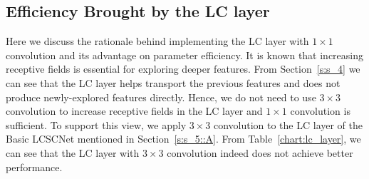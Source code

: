 \documentclass[journal]{IEEEtran}
\begin{document}
\subsection{Efficiency Brought by the LC layer} \label{s:s_5::B}

\begin{table}[htbp]
\centering
{}
\end{table}


Here we discuss the rationale behind implementing the LC layer with $1 \times 1$ convolution and its advantage on parameter efficiency. It is known that increasing receptive fields is essential for exploring deeper features. From Section~\ref{s:s_4} we can see that the LC layer helps transport the previous features and does not produce newly-explored features directly. Hence, we do not need to use $3 \times 3$ convolution to increase receptive fields in the LC layer and $1 \times 1$ convolution is sufficient. To support this view, we apply $3 \times 3$ convolution to the LC layer of the Basic LCSCNet mentioned in Section~\ref{s:s_5::A}. From Table~\ref{chart:lc_layer}, we can see that the LC layer with $3 \times 3$ convolution indeed does not achieve better performance.
\end{document}
